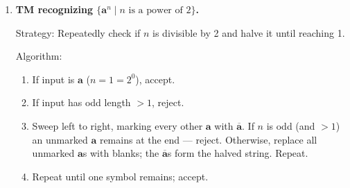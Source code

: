 \begin{enumerate}[{11.}1. ]
A \emph{semi-infinite tape} has a left boundary (leftmost cell = cell 1) and extends indefinitely to the right.

\begin{enumerate}
\item \textbf{Two-track simulation}: Store the nonnegative cells
$0,1,2,\ldots$ of the old tape on the upper track and the negative cells
$-1,-2,-3,\ldots$ on the lower track in reverse order. Thus column $0$ contains
the old cell $0$ on the upper track and a special boundary marker on the lower
track, while column $k\geq 1$ contains old cell $k$ on the upper track and old
cell $-k$ on the lower track.

The finite control remembers whether the simulated head is on the upper or lower
track. Moving right on the old nonnegative side means moving one column right on
the upper track; moving left from old cell $0$ switches to the lower track in
column $1$; moving right from old cell $-1$ switches back to the upper track in
column $0$; and all other moves on the negative side are simulated by moving one
column left or right on the lower track as appropriate.

\item \textbf{Equivalence proof}: Induct on the number of simulated steps. The
induction invariant is that the two tracks encode exactly the same tape contents
as the original bi-infinite tape, and that the simulated head position and state
are correctly represented by the current column together with the remembered
track. Each move of the old machine changes only one scanned cell and shifts the
head by one position, and the semi-infinite simulation reproduces exactly that
effect. Therefore the two machines accept and reject the same words. \qed
\end{enumerate}

\item \textbf{TM recognizing $\{\pmb{a}^n \mid n \text{ is a power of 2}\}$.}

Strategy: Repeatedly check if $n$ is divisible by 2 and halve it until reaching 1.

Algorithm:
\begin{enumerate}[1.]
\item If input is $\pmb{a}$ ($n=1=2^0$), accept.
\item If input has odd length $> 1$, reject.
\item Sweep left to right, marking every other $\pmb{a}$ with $\overline{\pmb{a}}$. If $n$ is odd (and $>1$) an unmarked $\pmb{a}$ remains at the end — reject. Otherwise, replace all unmarked $\pmb{a}$s with blanks; the $\overline{\pmb{a}}$s form the halved string. Repeat.
\item Repeat until one symbol remains; accept.
\end{enumerate}


\end{enumerate}

